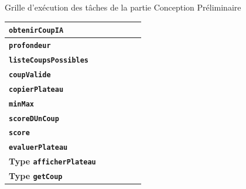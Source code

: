 \documentclass{beamer}
\begin{document}
\begin{frame}[label=cp]
\begin{alertblock}{Grille d’exécution des tâches de la partie \og Conception Préliminaire \fg }
{\begin{table}[h]
\begin{center}
\begin{tabular}{|l|c|c|c|c|c|}
 		\textbf{\texttt{obtenirCoupIA}} & & & &  \cellcolor{lightgray}&  \cellcolor{lightgray}  \\\hline
 		 		\textbf{\texttt{profondeur}} & & & &  \cellcolor{lightgray}&  \cellcolor{lightgray}  \\\hline
 		 		 		\textbf{\texttt{listeCoupsPossibles}} & & & &  \cellcolor{lightgray}&  \cellcolor{lightgray}  \\\hline
 		  		\textbf{\texttt{coupValide}} & & & &  \cellcolor{lightgray}&  \cellcolor{lightgray}  \\\hline
  		\textbf{\texttt{copierPlateau}} & & & &  \cellcolor{lightgray}&  \cellcolor{lightgray}  \\\hline
   		\textbf{\texttt{minMax}} & & & &  \cellcolor{lightgray}&  \cellcolor{lightgray}  \\\hline
   		 		\textbf{\texttt{scoreDUnCoup}} & & & &  \cellcolor{lightgray}&  \cellcolor{lightgray}  \\\hline
   	 		\textbf{\texttt{score}} & & & &  \cellcolor{lightgray}&  \cellcolor{lightgray}  \\\hline
   	 		 		\textbf{\texttt{evaluerPlateau}} & & & &  \cellcolor{lightgray}&  \cellcolor{lightgray}  \\\hline
   	\textbf{Type \texttt{afficherPlateau}} & \cellcolor{lightgray} & \cellcolor{lightgray} & \cellcolor{lightgray} & & \\\hline
   	 		 \textbf{Type \texttt{getCoup}} & & & & \cellcolor{lightgray}& \cellcolor{lightgray}\\\hline
\end{tabular}
\end{center}
\end{table}}

	\end{alertblock}
	\end{frame}
	
\end{document}
